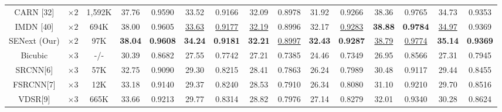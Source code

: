 \documentclass{ieeeaccess}
\begin{document}
\begin{table}
\begin{tabular}{|c|c|c|cc|cc|cc|cc|cc|cc|}
CARN [32] & $\times 2$ &1,592K& \multicolumn{1}{c|}{37.76} & 0.9590 & \multicolumn{1}{c|}{33.52} & 0.9166 & \multicolumn{1}{c|}{32.09} & 0.8978 & \multicolumn{1}{c|}{31.92} &0.9266 & \multicolumn{1}{c|}{38.36} & 0.9765
&\multicolumn{1}{c|}{34.73} & 0.9353\\


IMDN [40] & $\times 2$ &694K& \multicolumn{1}{c|}{38.00} & 0.9605 & \multicolumn{1}{c|}{\color{blue}\underline{33.63}} &{\color{blue}\underline{ 0.9177}} & \multicolumn{1}{c|}{\color{blue}\underline{32.19}} & 0.8996& \multicolumn{1}{c|}{32.17} & {\color{blue}\underline{0.9283}} & \multicolumn{1}{c|}{\color{red}\textbf{38.88}} &{\color{red}\textbf{0.9784}}
&\multicolumn{1}{c|}{\color{blue}\underline{34.97}} &  0.9369\\


SENext (Our) & $\times 2$ &97K& \multicolumn{1}{c|}{\color{red}\textbf{38.04}} &{\color{red}\textbf{0.9608}} & \multicolumn{1}{c|}{\color{red}\textbf{34.24} } &{\color{red}\textbf{ 0.9181}} & \multicolumn{1}{c|}{\color{red}\textbf{32.21}} &{\color{blue}\underline{0.8997}}& \multicolumn{1}{c|}{\color{red}\textbf{32.43}} &{\color{red}\textbf{0.9287}}& \multicolumn{1}{c|}{\color{blue}\underline{38.79}} &{\color{blue}\underline{0.9774}} &\multicolumn{1}{c|}{\color{red}\textbf{35.14}} & {\color{red}\textbf{0.9369}}\\
\hline

Bicubic&$\times3$ &-/-& \multicolumn{1}{c|}{30.39} & 0.8682  & \multicolumn{1}{c|}{27.55} & 0.7742 & \multicolumn{1}{c|}{27.21} & 0.7385 & \multicolumn{1}{c|}{24.46} & 0.7349  & \multicolumn{1}{c|}{26.95} &0.8566
&\multicolumn{1}{c|}{27.31} & 0.7945\\

SRCNN[6] & $\times3$ & 57K&\multicolumn{1}{c|}{32.75} & 0.9090  & \multicolumn{1}{c|}{29.30} & 0.8215  &\multicolumn{1}{c|}{28.41} & 0.7863  & \multicolumn{1}{c|}{26.24} &0.7989 & \multicolumn{1}{c|}{30.48} &0.9117
&\multicolumn{1}{c|}{29.44} & 0.8455\\


FSRCNN[7]& $\times3$ &12K& \multicolumn{1}{c|}{33.18} &0.9140& \multicolumn{1}{c|}{29.37} & 0.8240 &\multicolumn{1}{c|}{28.53} & 0.7910& \multicolumn{1}{c|}{26.34} &0.8080& \multicolumn{1}{c|}{31.10} &0.9210
&\multicolumn{1}{c|}{29.70} & 0.8516\\

VDSR[9]& $\times3$ &665K& \multicolumn{1}{c|}{33.66} & 0.9213 & \multicolumn{1}{c|}{29.77} & 0.8314 &\multicolumn{1}{c|}{28.82} & 0.7976& \multicolumn{1}{c|}{27.14} & 0.8279 & \multicolumn{1}{c|}{32.01} & 0.9340
&\multicolumn{1}{c|}{30.28} & 0.8624\\




\end{tabular}
\end{table}
\end{document}
